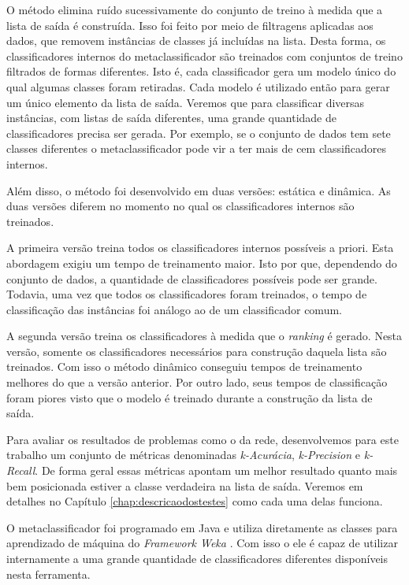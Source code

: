 O método elimina ruído sucessivamente do conjunto de treino à medida que a lista de saída é construída.
Isso foi feito por meio de filtragens aplicadas aos dados, que removem instâncias de classes já incluídas na lista.
Desta forma, os classificadores internos do metaclassificador são treinados com conjuntos de treino filtrados de formas diferentes.
Isto é, cada classificador gera um modelo único do qual algumas classes foram retiradas.
Cada modelo é utilizado então para gerar um único elemento da lista de saída.
Veremos que para classificar diversas instâncias, com listas de saída diferentes, uma grande quantidade de classificadores precisa ser gerada.
Por exemplo, se o conjunto de dados tem sete classes diferentes o metaclassificador pode vir a ter mais de cem classificadores internos.

Além disso, o método foi desenvolvido em duas versões: estática e dinâmica.
As duas versões diferem no momento no qual os classificadores internos são treinados.

A primeira versão treina todos os classificadores internos possíveis a priori.
Esta abordagem exigiu um tempo de treinamento maior.
Isto por que, dependendo do conjunto de dados, a quantidade de classificadores possíveis pode ser grande.
Todavia, uma vez que todos os classificadores foram treinados, o tempo de classificação das instâncias foi análogo ao de um classificador comum.

A segunda versão treina os classificadores à medida que o \textit{ranking} é gerado.
Nesta versão, somente os classificadores necessários para construção daquela lista são treinados.
Com isso o método dinâmico conseguiu tempos de treinamento melhores do que a versão anterior.
Por outro lado, seus tempos de classificação foram piores visto que o modelo é treinado durante a construção da lista de saída.

Para avaliar os resultados de problemas como o da rede, desenvolvemos para este trabalho um conjunto de métricas denominadas \textit{k-Acurácia}, \textit{k-Precision} e \textit{k-Recall}.
De forma geral essas métricas apontam um melhor resultado quanto mais bem posicionada estiver a classe verdadeira na lista de saída.
Veremos em detalhes no Capítulo \ref{chap:descricaodostestes} como cada uma delas funciona.

O metaclassificador foi programado em Java e utiliza diretamente as classes para aprendizado de máquina do \textit{Framework Weka} \cite{Hall}.
Com isso o ele é capaz de utilizar internamente a uma grande quantidade de classificadores diferentes disponíveis nesta ferramenta.

